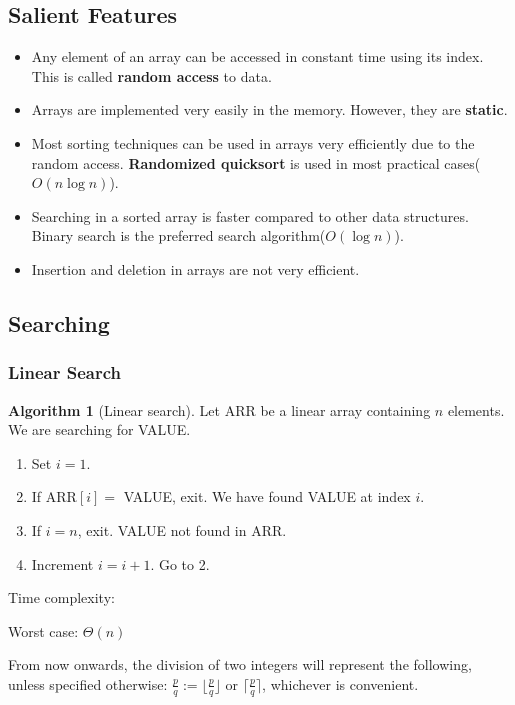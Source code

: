 \documentclass[10pt, a4paper]{extarticle}
\theoremstyle{definition}
\newtheorem{alg}{Algorithm}
\begin{document}
		\subsection{Salient Features}
		\begin{itemize}
			\item Any element of an array can be accessed in constant time using its index. This is called \textbf{random access} to data.
			\item Arrays are implemented very easily in the memory. However, they are \textbf{static}.
		\item Most sorting techniques can be used in arrays very efficiently due to the random access. \textbf{Randomized quicksort} is used in most practical cases($O(n\log n)$).
		\item Searching in a sorted array is faster compared to other data structures. Binary search is the preferred search algorithm($O(\log n)$).
		\item Insertion and deletion in arrays are not very efficient.
		\end{itemize}
	
	\subsection{Searching}
	\subsubsection{Linear Search}
	\begin{alg}[Linear search]
		Let ARR be a linear array containing $n$ elements. We are searching for VALUE.
		\begin{enumerate}
			\item Set $i=1$.
			\item If ARR$[i]=$ VALUE, exit. We have found VALUE at index $i$.
			\item If $i=n$, exit. VALUE not found in ARR.
			\item Increment $i=i+1$. Go to 2.
		\end{enumerate}
		Time complexity:

		Worst case: $\Theta(n)$
	\end{alg}
	From now onwards, the division of two integers will represent the following, unless specified otherwise: $\frac{p}{q}:=\lfloor\frac{p}{q}\rfloor$ or $\lceil\frac{p}{q}\rceil$, whichever is convenient.
\end{document}
